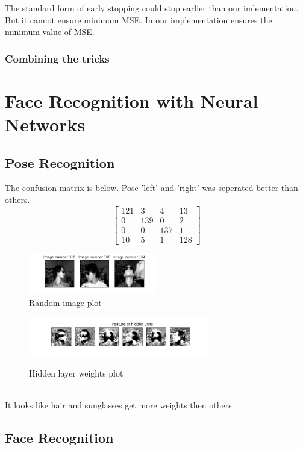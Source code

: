 \documentclass[a4paper]{article}
\begin{document}
The standard form of early stopping could stop earlier than our imlementation. But it cannot ensure minimum MSE.
In our implementation ensures the minimum value of MSE.
\subsubsection{Combining the tricks}
\section{Face Recognition with Neural Networks}
\subsection{Pose Recognition}
The confusion matrix is below. Pose 'left' and 'right' was seperated better than others.\\
\[
\begin{bmatrix}
  121 & 3 & 4 & 13 \\
  0 & 139 & 0 & 2 \\
  0 & 0 & 137 & 1 \\
  10 & 5 & 1 & 128
\end{bmatrix}
\]
\begin{figure}[h]
  \begin{center}
  \includegraphics[width=0.5\textwidth]{ex_2_1_random.png}\\
  \caption{Random image plot}
  \includegraphics[width=0.7\textwidth]{ex_2_1_hidden.png}\\
  \caption{Hidden layer weights plot}
  \end{center}
\end{figure}\\
It looks like hair and sunglasses get more weights then others.
\subsection{Face Recognition}
\end{document}
